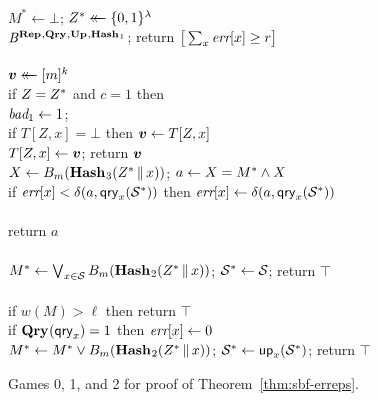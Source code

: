 \begin{figure*}
{
  \vspace{-7pt}
  \hfill {}\\[2pt]
    $M^* \gets \bot$;
    $Z^* \mathrel{\leftarrow\mkern-14mu\leftarrow} \{0,1\}^\lambda$\\
    $\mathit{B}^{\textup{\textbf{Rep}}\hspace{0.5pt},\textup{\textbf{Qry}}\hspace{0.5pt},\textup{\textbf{Up}}\hspace{0.5pt},\textup{\textbf{Hash}}\hspace{0.5pt}_1}$;
    return $\big[\sum_x \textit{err}[x] \geq r\big]$
  \\[6pt]
  \\[2pt]
    $\boldsymbol{v} \mathrel{\leftarrow\mkern-14mu\leftarrow} [m]^k$\\
    if $Z=Z^*$ and $c = 1$ then \\
    \tab $\textit{bad}_1 \gets 1$; \\
    if $T[Z,x] = \bot$ then $\boldsymbol{v} \gets T[Z,x]$\\
    $T[Z,x] \gets \boldsymbol{v}$; return $\boldsymbol{v}$
}
{
  \\[2pt]
    $X \gets {B}_m(\textup{\textbf{Hash}}\hspace{0.5pt}_3(Z^* \, \| \, x))$;
    $a \gets X = M^* \wedge X$\\
    if $\textit{err}[x] < \delta(a,\mathsf{qry}_x(\mathcal{S}^*))$ then
          $\textit{err}[x] \gets \delta(a,\mathsf{qry}_x(\mathcal{S}^*))$\\
    \\
    return $a$
  \\[6pt]
  \oraclev{$\REPO(\col)$}\\[2pt]
    $M^* \gets \bigvee_{x \in \mathcal{S}} {B}_m(\textup{\textbf{Hash}}\hspace{0.5pt}_2(Z^* \, \| \, x))$;
    $\mathcal{S}^* \gets \mathcal{S}$;
    return $\top$
  \\[6pt]
  \\[2pt]
    if $w(M) > \ell$ then return $\top$\\
    if $\textup{\textbf{Qry}}\hspace{0.5pt}(\mathsf{qry}_x) = 1$ then $\textit{err}[x] \gets 0$\\
    $M^* \gets M^* \vee {B}_m(\textup{\textbf{Hash}}\hspace{0.5pt}_2(Z^* \, \| \, x))$;
    $\mathcal{S}^* \gets \mathsf{up}_x(\mathcal{S}^*)$;
    return $\top$
}
\caption{Games 0, 1, and 2 for proof of Theorem~\ref{thm:sbf-erreps}.}
\label{fig:sbf-erreps/games}
\end{figure*}


